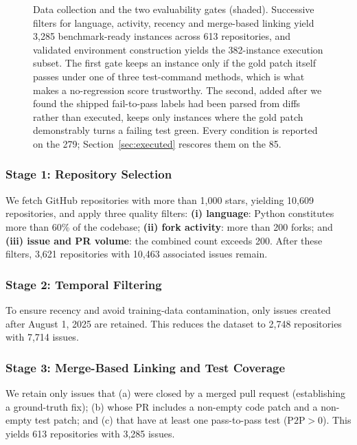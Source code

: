 \documentclass[journal]{IEEEtran}
\begin{document}
\begin{figure}[t]
\caption{Data collection and the two evaluability gates (shaded). Successive filters for language, activity, recency and merge-based linking yield 3,285 benchmark-ready instances across 613 repositories, and validated environment construction yields the 382-instance execution subset. The first gate keeps an instance only if the gold patch itself passes under one of three test-command methods, which is what makes a no-regression score trustworthy. The second, added after we found the shipped fail-to-pass labels had been parsed from diffs rather than executed, keeps only instances where the gold patch demonstrably turns a failing test green. Every condition is reported on the 279; Section~\ref{sec:executed} rescores them on the 85.}
\label{fig:data_collection}
\end{figure}

\subsubsection{Stage 1: Repository Selection}
We fetch GitHub repositories with more than 1,000 stars, yielding 10,609 repositories, and apply three quality filters: \textbf{(i) language}: Python constitutes more than 60\% of the codebase; \textbf{(ii) fork activity}: more than 200 forks; and \textbf{(iii) issue and PR volume}: the combined count exceeds 200. After these filters, 3,621 repositories with 10,463 associated issues remain.

\subsubsection{Stage 2: Temporal Filtering}
To ensure recency and avoid training-data contamination, only issues created after August 1, 2025 are retained. This reduces the dataset to 2,748 repositories with 7,714 issues.

\subsubsection{Stage 3: Merge-Based Linking and Test Coverage}
We retain only issues that (a) were closed by a merged pull request (establishing a ground-truth fix); (b) whose PR includes a non-empty code patch and a non-empty test patch; and (c) that have at least one pass-to-pass test ($\text{P2P} > 0$). This yields 613 repositories with 3,285 issues.
\end{document}

